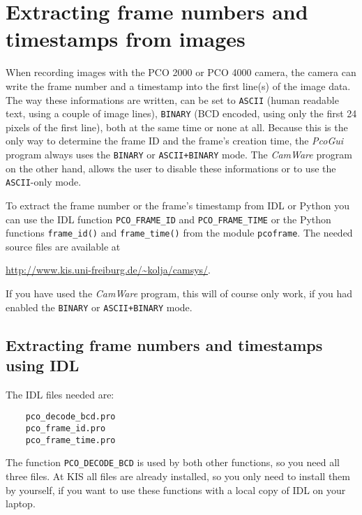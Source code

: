 \documentclass[11pt, a4paper]{scrartcl}
\begin{document}
\section{Extracting frame numbers and timestamps from images}
\label{sec:pcoframe}

When recording images with the PCO 2000 or PCO 4000 camera, the camera can write the frame number and a timestamp into the first line(s) of the image data. The way these informations are written, can be set to \texttt{ASCII} (human readable text, using a couple of image lines), \texttt{BINARY} (BCD encoded, using only the first 24 pixels of the first line), both at the same time or none at all. Because this is the only way to determine the frame ID and the frame's creation time, the \emph{PcoGui} program always uses the \texttt{BINARY} or \texttt{ASCII+BINARY} mode. The \emph{CamWare} program on the other hand, allows the user to disable these informations or to use the \texttt{ASCII}-only mode.

To extract the frame number or the frame's timestamp from IDL or Python you can use the IDL function \texttt{PCO\_FRAME\_ID} and \texttt{PCO\_FRAME\_TIME} or the Python functions \texttt{frame\_id()} and \texttt{frame\_time()} from the module \texttt{pcoframe}. The needed source files are available at
\begin{center}
\url{http://www.kis.uni-freiburg.de/~kolja/camsys/}.
\end{center}
If you have used the \emph{CamWare} program, this will of course only work, if you had enabled the \texttt{BINARY} or \texttt{ASCII+BINARY} mode.

\subsection{Extracting frame numbers and timestamps using IDL}
The IDL files needed are:
\begin{verbatim}
    pco_decode_bcd.pro
    pco_frame_id.pro
    pco_frame_time.pro
\end{verbatim}
The function \texttt{PCO\_DECODE\_BCD} is used by both other functions, so you need all three files. At KIS all files are already installed, so you only need to install them by yourself, if you want to use these functions with a local copy of IDL on your laptop.
\end{document}
